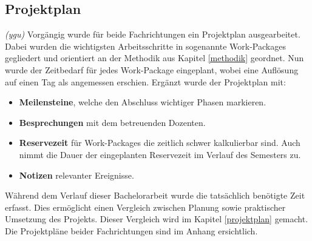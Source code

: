 \subsection{Projektplan}
\textit{(ygu)} Vorgängig wurde für beide Fachrichtungen ein Projektplan ausgearbeitet. Dabei wurden die wichtigsten Arbeitsschritte in sogenannte Work-Packages gegliedert und orientiert an der Methodik aus Kapitel \ref{methodik} geordnet. Nun wurde der Zeitbedarf für jedes Work-Package eingeplant, wobei eine Auflösung auf einen Tag als angemessen erschien. Ergänzt wurde der Projektplan mit:

\begin{itemize}
	\item \textbf{Meilensteine}, welche den Abschluss wichtiger Phasen markieren.
	
	\item \textbf{Besprechungen} mit dem betreuenden Dozenten.
	
	\item \textbf{Reservezeit} für Work-Packages die zeitlich schwer kalkulierbar sind. Auch nimmt die Dauer der eingeplanten Reservezeit im Verlauf des Semesters zu.
	
	\item \textbf{Notizen} relevanter Ereignisse.
\end{itemize}

Während dem Verlauf dieser Bachelorarbeit wurde die tatsächlich benötigte Zeit erfasst. Dies ermöglicht einen Vergleich zwischen Planung sowie praktischer Umsetzung des Projekts. Dieser Vergleich wird im Kapitel \ref{projektplan} gemacht. Die Projektpläne beider Fachrichtungen sind im Anhang ersichtlich. 